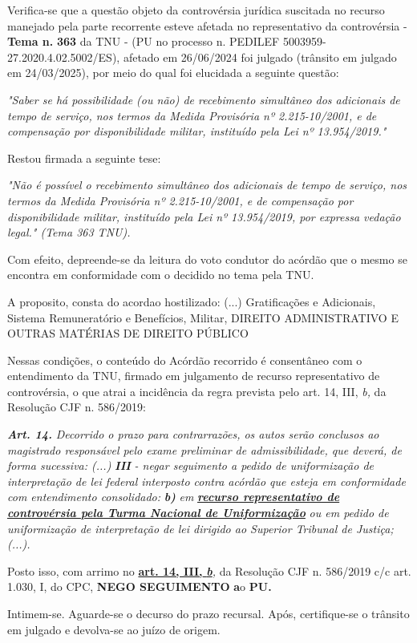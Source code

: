 \documentclass[12pt]{article}
\begin{document}
\justifying
\noindent Verifica-se que a questão objeto da controvérsia jurídica suscitada no recurso manejado pela parte recorrente esteve afetada no representativo da controvérsia - \textbf{Tema n. }\textbf{363} da TNU - (PU no processo n. PEDILEF 5003959-27.2020.4.02.5002/ES),  afetado em 26/06/2024 foi julgado (trânsito em julgado em 24/03/2025), por meio do qual foi elucidada a seguinte questão:

\noindent \textit{"Saber se há possibilidade (ou não) de recebimento simultâneo dos adicionais de tempo de serviço, nos termos da Medida Provisória nº 2.215-10/2001, e de compensação por disponibilidade militar, instituído pela Lei nº 13.954/2019."}

\noindent Restou firmada a seguinte tese:

\noindent \textit{"Não é possível o recebimento simultâneo dos adicionais de tempo de serviço, nos termos da Medida Provisória nº 2.215-10/2001, e de compensação por disponibilidade militar, instituído pela Lei nº 13.954/2019, por expressa vedação legal." (Tema 363 TNU).}

\noindent Com efeito, depreende-se da leitura do voto condutor do acórdão que o mesmo se encontra em conformidade com o decidido no  tema pela TNU.

\noindent A proposito, consta do acordao hostilizado: (...) Gratificações e Adicionais, Sistema Remuneratório e Benefícios, Militar, DIREITO ADMINISTRATIVO E OUTRAS MATÉRIAS DE DIREITO PÚBLICO

\noindent Nessas condições, o conteúdo do Acórdão recorrido é consentâneo com o entendimento da TNU, firmado em julgamento de recurso representativo de controvérsia, o que atrai a incidência da regra prevista pelo art. 14, III, \textit{b,} da Resolução CJF n. 586/2019:

\noindent \textit{\textbf{Art. 14.}}\textit{ Decorrido o prazo para contrarrazões, os autos serão conclusos ao magistrado responsável pelo exame preliminar de admissibilidade, que deverá, de forma sucessiva: (...) }\textit{\textbf{III }}\textit{- negar seguimento a pedido de uniformização de interpretação de lei federal interposto contra acórdão que esteja em conformidade com entendimento consolidado: }\textit{\textbf{b)}}\textit{ em }\uline{\textit{\textbf{recurso representativo de controvérsia pela Turma Nacional de Uniformização}}}\textit{ ou em pedido de uniformização de interpretação de lei dirigido ao Superior Tribunal de Justiça;(...).}

\noindent Posto isso, com arrimo no \uline{\textbf{art. 14, III, }}\uline{\textit{\textbf{b}}}\textit{,} da Resolução CJF n. 586/2019 c/c art. 1.030, I, do CPC, \textbf{NEGO SEGUIMENTO }\textbf{a}o\textbf{ PU}\textbf{.}

\noindent Intimem-se. Aguarde-se o decurso do prazo recursal. Após, certifique-se o trânsito em julgado e devolva-se ao juízo de origem.
\end{document}

